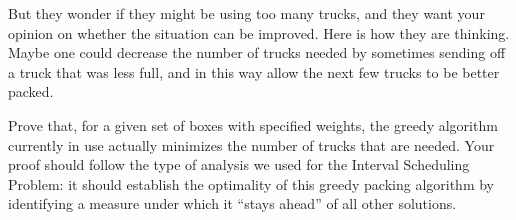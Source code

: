 \documentclass[11pt,a4paper]{article}
\theoremstyle{plain}
\begin{document}
\begin{enumerate}[leftmargin=*]
But they wonder if they might be using too many trucks, and they want your opinion on whether the situation can be improved. Here is how they are thinking. Maybe one could decrease the number of trucks needed by sometimes sending off a truck that was less full, and in this way allow the next few trucks to be better packed.

Prove that, for a given set of boxes with specified weights, the greedy algorithm currently in use actually minimizes the number of trucks that are needed. Your proof should follow the type of analysis we used for the Interval Scheduling Problem: it should establish the optimality of this greedy packing algorithm by identifying a measure under which it ``stays ahead'' of all other solutions.

\end{enumerate}
\end{document}
